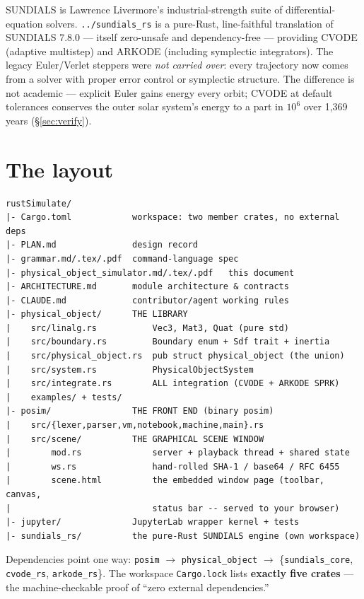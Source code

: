 \documentclass[11pt]{article}
\newcommand{\code}[1]{\texttt{#1}}
\begin{document}
SUNDIALS is Lawrence Livermore's industrial-strength suite of
differential-equation solvers. \code{../sundials\_rs} is a pure-Rust,
line-faithful translation of SUNDIALS 7.8.0 --- itself zero-unsafe and
dependency-free --- providing CVODE (adaptive multistep) and ARKODE
(including symplectic integrators). The legacy Euler/Verlet steppers
were \emph{not carried over}: every trajectory now comes from a solver
with proper error control or symplectic structure. The difference is not
academic --- explicit Euler gains energy every orbit; CVODE at default
tolerances conserves the outer solar system's energy to a part in
$10^{6}$ over 1{,}369 years (\S\ref{sec:verify}).

\section{The layout}

\begin{lstlisting}
rustSimulate/
|- Cargo.toml            workspace: two member crates, no external deps
|- PLAN.md               design record
|- grammar.md/.tex/.pdf  command-language spec
|- physical_object_simulator.md/.tex/.pdf   this document
|- ARCHITECTURE.md       module architecture & contracts
|- CLAUDE.md             contributor/agent working rules
|- physical_object/      THE LIBRARY
|    src/linalg.rs           Vec3, Mat3, Quat (pure std)
|    src/boundary.rs         Boundary enum + Sdf trait + inertia
|    src/physical_object.rs  pub struct physical_object (the union)
|    src/system.rs           PhysicalObjectSystem
|    src/integrate.rs        ALL integration (CVODE + ARKODE SPRK)
|    examples/ + tests/
|- posim/                THE FRONT END (binary posim)
|    src/{lexer,parser,vm,notebook,machine,main}.rs
|    src/scene/          THE GRAPHICAL SCENE WINDOW
|        mod.rs              server + playback thread + shared state
|        ws.rs               hand-rolled SHA-1 / base64 / RFC 6455
|        scene.html          the embedded window page (toolbar, canvas,
|                            status bar -- served to your browser)
|- jupyter/              JupyterLab wrapper kernel + tests
|- sundials_rs/          the pure-Rust SUNDIALS engine (own workspace)
\end{lstlisting}

Dependencies point one way:
\code{posim} $\to$ \code{physical\_object} $\to$
\{\code{sundials\_core}, \code{cvode\_rs}, \code{arkode\_rs}\}. The
workspace \code{Cargo.lock} lists \textbf{exactly five crates} --- the
machine-checkable proof of ``zero external dependencies.''
\end{document}
